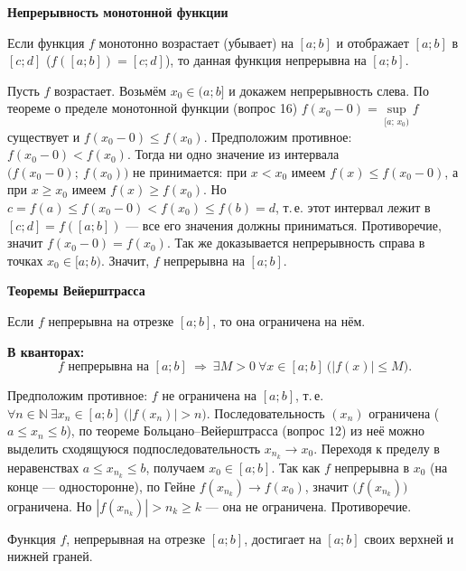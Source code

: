 \documentclass[a4paper,11pt]{article}
\newcommand{\N}{\mathbb{N}}
\newcommand{\kv}{\par\noindent\textbf{\textcolor{oprc!85!black}{В кванторах:}}}
\newcommand{\podr}[1]{\par\needspace{8\baselineskip}\medskip
  {\large\bfseries\textcolor{oprc!80!black}{#1}}\par\nopagebreak\smallskip}
\begin{document}
\podr{Непрерывность монотонной функции}

\begin{teo}[3]
Если функция $f$ монотонно возрастает (убывает) на $[a; b]$ и отображает $[a; b]$ в $[c; d]$
($f([a; b]) = [c; d]$), то данная функция непрерывна на $[a; b]$.
\end{teo}

\begin{dop}
Пусть $f$ возрастает. Возьмём $x_0 \in (a; b]$ и докажем непрерывность слева. По теореме о пределе монотонной функции
(вопрос 16) $f(x_0 - 0) = \sup\limits_{[a;\, x_0)} f$ существует и $f(x_0 - 0) \le f(x_0)$.
Предположим противное: $f(x_0 - 0) < f(x_0)$. Тогда ни одно значение из интервала $\bigl(f(x_0 - 0);\ f(x_0)\bigr)$ не принимается:
при $x < x_0$ имеем $f(x) \le f(x_0 - 0)$, а при $x \ge x_0$ имеем $f(x) \ge f(x_0)$. Но
$c = f(a) \le f(x_0 - 0) < f(x_0) \le f(b) = d$, т.\,е. этот интервал лежит в $[c; d] = f([a; b])$ --- все его значения
должны приниматься. Противоречие, значит $f(x_0 - 0) = f(x_0)$.
Так же доказывается непрерывность справа в точках $x_0 \in [a; b)$. Значит, $f$ непрерывна на $[a; b]$.
\end{dop}

\podr{Теоремы Вейерштрасса}

\begin{teo}
Если $f$ непрерывна на отрезке $[a; b]$, то она ограничена на нём.
\kv
\[
  f \text{ непрерывна на } [a; b] \ \Longrightarrow\ \exists M > 0\ \forall x \in [a; b]\ \bigl(|f(x)| \le M\bigr).
\]
\end{teo}

\begin{dop}
Предположим противное: $f$ не ограничена на $[a; b]$, т.\,е. $\forall n \in \N\ \exists x_n \in [a; b]\ \bigl(|f(x_n)| > n\bigr)$.
Последовательность $(x_n)$ ограничена ($a \le x_n \le b$), по теореме Больцано--Вейерштрасса (вопрос 12) из неё можно выделить
сходящуюся подпоследовательность $x_{n_k} \to x_0$. Переходя к пределу в неравенствах $a \le x_{n_k} \le b$, получаем
$x_0 \in [a; b]$. Так как $f$ непрерывна в $x_0$ (на конце --- односторонне), по Гейне $f(x_{n_k}) \to f(x_0)$, значит
$\bigl(f(x_{n_k})\bigr)$ ограничена. Но $|f(x_{n_k})| > n_k \ge k$ --- она не ограничена. Противоречие.
\end{dop}

\begin{teo}
Функция $f$, непрерывная на отрезке $[a; b]$, достигает на $[a; b]$ своих верхней и нижней граней.
\end{teo}
\end{document}
